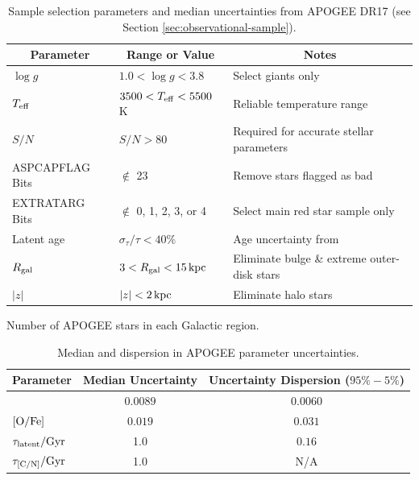 \documentclass[twocolumn,twocolappendix,linenumbers]{aastex631}
\newcommand{\todo}[1]{{\color{red}#1}}
\begin{document}
\begin{table}
    \centering
    \caption{Sample selection parameters and median uncertainties from APOGEE DR17 (see Section \ref{sec:observational-sample}).}
    \label{tab:sample}
    \begin{tabular}{lll}
        \hline\hline
        \multicolumn{1}{c}{Parameter} & \multicolumn{1}{c}{Range or Value} & \multicolumn{1}{c}{Notes} \\
        \hline
        $\log g$            & $1.0 < \log g < 3.8$          & Select giants only \\
        $T_{\rm eff}$       & $3500 < T_{\rm eff} < 5500$ K & Reliable temperature range \\
        $S/N$               & $S/N > 80$                    & Required for accurate stellar parameters \\
        ASPCAPFLAG Bits     & $\notin$ 23                   & Remove stars flagged as bad \\
        EXTRATARG Bits      & $\notin$ 0, 1, 2, 3, or 4     & Select main red star sample only \\
        Latent age          & $\sigma_\tau/\tau < 40\%$     & Age uncertainty from \citet{leung_variational_2023} \\
        $R_{\rm gal}$     & $3 < R_{\rm gal} < 15\,{\rm kpc}$    & Eliminate bulge \& extreme outer-disk stars \\
        $|z|$               & $|z| < 2\,{\rm kpc}$                 & Eliminate halo stars \\
        \hline
    \end{tabular}
\end{table}

\begin{table}
\centering
\caption{Number of APOGEE stars in each Galactic region.}
\label{tab:apogee-regions}

\end{table}

\begin{table}
    \centering
    \caption{Median and dispersion in APOGEE parameter uncertainties.}
    \label{tab:uncertainties}
    \begin{tabular}{lcc}
        \hline\hline
        \multicolumn{1}{c}{Parameter} & \multicolumn{1}{c}{Median Uncertainty} & \multicolumn{1}{c}{Uncertainty Dispersion ($95\%-5\%$)} \\
        \hline
        [Fe/H]          & $0.0089$   & $0.0060$ \\
        ${\rm [O/Fe]}$  & $0.019$    & $0.031$ \\
        $\tau_{\rm latent}/{\rm Gyr}$    & 1.0   & $0.16$ \\
        $\tau_{\rm [C/N]}/{\rm Gyr}$     & 1.0   & \todo{N/A} \\
        \hline
    \end{tabular}
\end{table}
\end{document}
